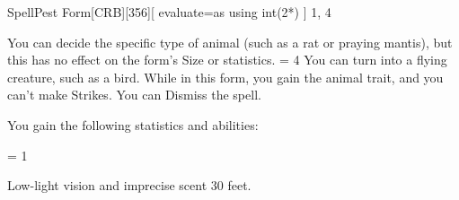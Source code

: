 
\begin{card-collection}{Spell}{\level}{Pest Form}[CRB][356]{[
  evaluate=\level as \dice using int(2*\level)
] \level}{1, 4}





You can decide the specific type of animal (such as a rat or praying mantis), but this has no effect on the form's Size or statistics. 
\ifnum \level = 4
You can turn into a flying creature, such as a bird.
\fi
While in this form, you gain the animal trait, and you can't make Strikes. You can Dismiss the spell.

You gain the following statistics and abilities:

\ifnum \level = 1
\else
{}
\fi


Low-light vision and imprecise scent 30 feet.

\end{card-collection}